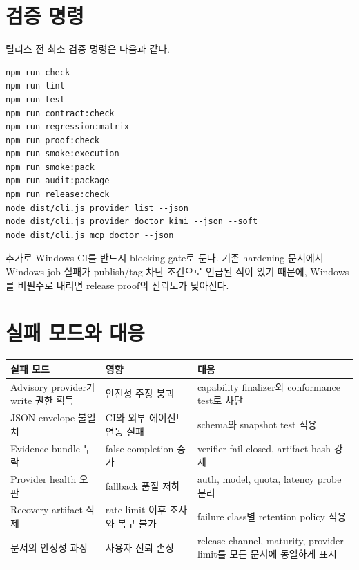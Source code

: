 \documentclass[11pt,a4paper]{article}
\newcommand{\code}[1]{\texttt{\detokenize{#1}}}
\begin{document}
\section{검증 명령}
릴리스 전 최소 검증 명령은 다음과 같다.

\begin{verbatim}
npm run check
npm run lint
npm run test
npm run contract:check
npm run regression:matrix
npm run proof:check
npm run smoke:execution
npm run smoke:pack
npm run audit:package
npm run release:check
node dist/cli.js provider list --json
node dist/cli.js provider doctor kimi --json --soft
node dist/cli.js mcp doctor --json
\end{verbatim}

추가로 Windows CI를 반드시 blocking gate로 둔다. 기존 hardening 문서에서 Windows job 실패가 publish/tag 차단 조건으로 언급된 적이 있기 때문에, Windows를 비필수로 내리면 release proof의 신뢰도가 낮아진다.

\section{실패 모드와 대응}
\begin{longtable}{p{42mm}p{55mm}p{62mm}}
\toprule
실패 모드 & 영향 & 대응 \\
\midrule
Advisory provider가 write 권한 획득 & 안전성 주장 붕괴 & capability finalizer와 conformance test로 차단 \\
JSON envelope 불일치 & CI와 외부 에이전트 연동 실패 & \code{omk.command.v1} schema와 snapshot test 적용 \\
Evidence bundle 누락 & false completion 증가 & verifier fail-closed, artifact hash 강제 \\
Provider health 오판 & fallback 품질 저하 & auth, model, quota, latency probe 분리 \\
Recovery artifact 삭제 & rate limit 이후 조사와 복구 불가 & failure class별 retention policy 적용 \\
문서의 안정성 과장 & 사용자 신뢰 손상 & release channel, maturity, provider limit를 모든 문서에 동일하게 표시 \\
\bottomrule
\end{longtable}
\end{document}
